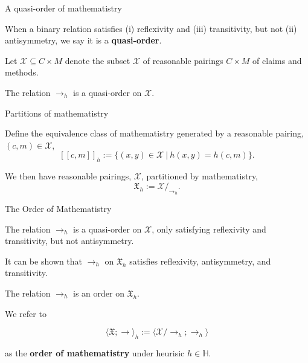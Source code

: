 \documentclass{beamer}
\begin{document}
\begin{frame}{A quasi-order of mathematistry}

 \begin{definition}
 When a binary relation satisfies (i) reflexivity and (iii) transitivity, but not (ii) antisymmetry, we say it is a \textbf{quasi-order}.
 \end{definition}

\vspace{1cm}

 Let $\mathcal X \subseteq C \times M$ denote the subset $\mathcal X$ of reasonable pairings $C \times M$ of claims and methods.

 \bigskip

    \begin{lemma}\label{lem:quasi}
The relation $\to_h$ is a quasi-order on $\mathcal X$.
\end{lemma}
\end{frame}

\begin{frame}{Partitions of mathematistry}

Define the equivalence class of mathematistry generated by a reasonable pairing, $(c,m) \in \mathcal X$,
$$
[[c,m]]_h := \{(x,y) \in \mathcal X \ | \ h(x,y) = h(c,m)\}.
$$

\bigskip

We then have reasonable pairings, $\mathcal X$, partitioned by mathematistry,
$$\mathfrak X_h := \mathcal X/_{\to_h}.$$


\end{frame}

\begin{frame}{The Order of Mathematistry}

The relation $\to_h$ is a quasi-order on $\mathcal X$, only satisfying reflexivity and transitivity, but not antisymmetry.

\bigskip

It can be shown that $\to_h$ on $\mathfrak X_h$ satisfies reflexivity, antisymmetry, and transitivity.

\end{frame}



\begin{frame}

\begin{theorem}
The relation $\to_h$ is an order on $\mathfrak X_h$.
\end{theorem}

\bigskip

\begin{definition}\label{def: mathy}
We refer to

\medskip

$$
\langle \mathfrak X; \to \rangle_h := \langle \mathcal X/\to_h ; \to_h \rangle
$$

\medskip

as the \textbf{order of mathematistry} under heurisic $h \in \mathbb H$.
\end{definition}



\end{frame}
\end{document}

